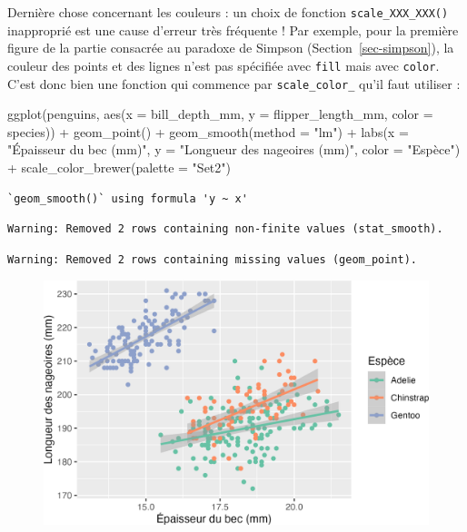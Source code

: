 \documentclass[
  letterpaper,
  DIV=11,
  numbers=noendperiod]{scrreprt}
\newenvironment{Shaded}{\begin{snugshade}}{\end{snugshade}}
\newcommand{\AttributeTok}[1]{\textcolor[rgb]{0.40,0.45,0.13}{#1}}
\newcommand{\FunctionTok}[1]{\textcolor[rgb]{0.28,0.35,0.67}{#1}}
\newcommand{\NormalTok}[1]{\textcolor[rgb]{0.00,0.23,0.31}{#1}}
\newcommand{\SpecialCharTok}[1]{\textcolor[rgb]{0.37,0.37,0.37}{#1}}
\newcommand{\StringTok}[1]{\textcolor[rgb]{0.13,0.47,0.30}{#1}}
\begin{document}
Dernière chose concernant les couleurs : un choix de fonction
\texttt{scale\_XXX\_XXX()} inapproprié est une cause d'erreur très
fréquente ! Par exemple, pour la première figure de la partie consacrée
au paradoxe de Simpson (Section~\ref{sec-simpson}), la couleur des
points et des lignes n'est pas spécifiée avec \texttt{fill} mais avec
\texttt{color}. C'est donc bien une fonction qui commence par
\texttt{scale\_color\_} qu'il faut utiliser :

\begin{Shaded}
\begin{Highlighting}[]
\FunctionTok{ggplot}\NormalTok{(penguins, }\FunctionTok{aes}\NormalTok{(}\AttributeTok{x =}\NormalTok{ bill\_depth\_mm, }\AttributeTok{y =}\NormalTok{ flipper\_length\_mm,}
                     \AttributeTok{color =}\NormalTok{ species)) }\SpecialCharTok{+}
  \FunctionTok{geom\_point}\NormalTok{() }\SpecialCharTok{+}
  \FunctionTok{geom\_smooth}\NormalTok{(}\AttributeTok{method =} \StringTok{"lm"}\NormalTok{) }\SpecialCharTok{+}
  \FunctionTok{labs}\NormalTok{(}\AttributeTok{x =} \StringTok{"Épaisseur du bec (mm)"}\NormalTok{, }\AttributeTok{y =} \StringTok{"Longueur des nageoires (mm)"}\NormalTok{,}
       \AttributeTok{color =} \StringTok{"Espèce"}\NormalTok{) }\SpecialCharTok{+}
  \FunctionTok{scale\_color\_brewer}\NormalTok{(}\AttributeTok{palette =} \StringTok{"Set2"}\NormalTok{)}
\end{Highlighting}
\end{Shaded}

\begin{verbatim}
`geom_smooth()` using formula 'y ~ x'
\end{verbatim}

\begin{verbatim}
Warning: Removed 2 rows containing non-finite values (stat_smooth).
\end{verbatim}

\begin{verbatim}
Warning: Removed 2 rows containing missing values (geom_point).
\end{verbatim}

\begin{figure}[H]

{\centering \includegraphics{./03-visualization_files/figure-pdf/unnamed-chunk-102-1.png}

}

\end{figure}
\end{document}
